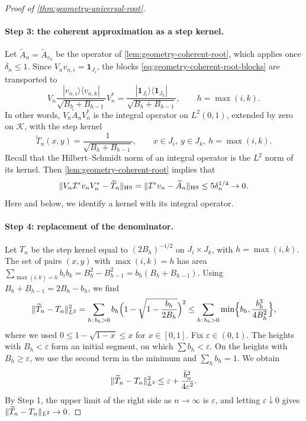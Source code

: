 \begin{proof}[Proof of \cref{thm:geometry-universal-root}]
\paragraph{Step 3: the coherent approximation as a step kernel.}
Let $\widetilde A_n=\widetilde A_{v_n}$ be the operator of \cref{lem:geometry-coherent-root}, which applies once $\delta_n\le1$. Since $V_nv_{n,i}=\mathbf1_{J_i}$, the blocks \eqref{eq:geometry-coherent-root-blocks} are transported to
\[
 V_n\frac{|v_{n,i}\rangle\langle v_{n,k}|}{\sqrt{B_h+B_{h-1}}}V_n^*
 =\frac{|\mathbf1_{J_i}\rangle\langle\mathbf1_{J_k}|}{\sqrt{B_h+B_{h-1}}},
 \qquad h=\max(i,k).
\]
In other words, $V_n\widetilde A_nV_n^*$ is the integral operator on $L^2(0,1)$, extended by zero on $\mathcal K$, with the step kernel
\[
 \widetilde T_n(x,y)=\frac1{\sqrt{B_h+B_{h-1}}},\qquad x\in J_i,\ y\in J_k,\ h=\max(i,k).
\]
Recall that the Hilbert--Schmidt norm of an integral operator is the $L^2$ norm of its kernel. Then \cref{lem:geometry-coherent-root} implies that
\[
 \lVert V_n\mathcal I^*v_nV_n^*-\widetilde T_n\rVert_{\mathrm{HS}}=\lVert\mathcal I^*v_n-\widetilde A_n\rVert_{\mathrm{HS}}\le5\delta_n^{1/4}\to0 .
\]
Here and below, we identify a kernel with its integral operator.

\paragraph{Step 4: replacement of the denominator.}
Let $T_n$ be the step kernel equal to $(2B_h)^{-1/2}$ on $J_i\times J_k$, with $h=\max(i,k)$. The set of pairs $(x,y)$ with $\max(i,k)=h$ has area $\sum_{\max(i,k)=h}b_ib_k=B_h^2-B_{h-1}^2=b_h(B_h+B_{h-1})$. Using $B_h+B_{h-1}=2B_h-b_h$, we find
\[
 \lVert\widetilde T_n-T_n\rVert_{L^2}^2
 =\sum_{h:\,b_h>0}b_h\Bigl(1-\sqrt{1-\frac{b_h}{2B_h}}\Bigr)^2
 \le\sum_{h:\,b_h>0}\min\Bigl\{b_h,\frac{b_h^3}{4B_h^2}\Bigr\},
\]
where we used $0\le1-\sqrt{1-x}\le x$ for $x\in[0,1]$. Fix $\varepsilon\in(0,1)$. The heights with $B_h<\varepsilon$ form an initial segment, on which $\sum b_h<\varepsilon$. On the heights with $B_h\ge\varepsilon$, we use the second term in the minimum and $\sum_hb_h=1$. We obtain
\[
 \lVert\widetilde T_n-T_n\rVert_{L^2}^2\le\varepsilon+\frac{\bar b_n^2}{4\varepsilon^2} .
\]
By Step 1, the upper limit of the right side as $n\to\infty$ is $\varepsilon$, and letting $\varepsilon\downarrow0$ gives $\lVert\widetilde T_n-T_n\rVert_{L^2}\to0$.


\end{proof}

